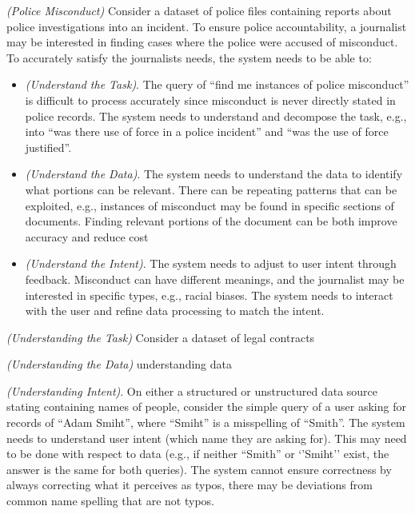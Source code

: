 \begin{example}\textit{(Police Misconduct)}
     Consider a dataset of police files containing reports about police investigations into an incident. To ensure police accountability, a journalist may be interested in finding cases where the police were accused of misconduct. To accurately satisfy the journalists needs, the system needs to be able to:
     \begin{itemize}
         \item \textit{(Understand the Task)}. The query of ``find me instances of police misconduct'' is difficult to process accurately since misconduct is never directly stated in police records. The system needs to understand and decompose the task, e.g., into ``was there use of force in a police incident'' and ``was the use of force justified''.
         \item \textit{(Understand the Data)}.  The system needs to understand the data to identify what portions can be relevant. There can be repeating patterns that can be exploited, e.g., instances of misconduct may be found in specific sections of documents. Finding relevant portions of the document can be both improve accuracy and reduce cost 
         \item \textit{(Understand the Intent)}. The system needs to adjust to user intent through feedback. Misconduct can have different meanings, and the journalist may be interested in specific types, e.g., racial biases. The system needs to interact with the user and refine data processing to match the intent. 
     \end{itemize}
\end{example}
\begin{example}\textit{(Understanding the Task)}
     Consider a dataset of legal contracts
\end{example}

\begin{example}\textit{(Understanding the Data)}
     understanding data
\end{example}

\begin{example}
     \textit{(Understanding Intent)}. On either a structured or unstructured data source stating containing names of people, consider the simple query of a user asking for records of ``Adam Smiht'', where ``Smiht'' is a misspelling of ``Smith''. The system needs to understand user intent (which name they are asking for). This may need to be done with respect to data (e.g., if neither ``Smith'' or `'Smiht'' exist, the answer is the same for both queries). The system cannot ensure correctness by always correcting what it perceives as typos, there may be deviations from common name spelling that are not typos. 
\end{example}
\fi

